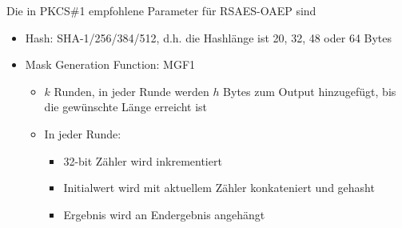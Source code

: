 \noindent Die in PKCS\#1 empfohlene Parameter für RSAES-OAEP sind 
\begin{itemize}
    \item Hash: SHA-1/256/384/512, d.h. die Hashlänge ist 20, 32, 48 oder 64 Bytes
    \item Mask Generation Function: MGF1
    \begin{itemize}
        \item $k$ Runden, in jeder Runde werden $h$ Bytes zum Output hinzugefügt, bis die gewünschte Länge erreicht ist
        \item In jeder Runde:
        \begin{itemize}
            \item 32-bit Zähler wird inkrementiert
            \item Initialwert wird mit aktuellem Zähler konkateniert und gehasht
            \item Ergebnis wird an Endergebnis angehängt
        \end{itemize}
    \end{itemize}
\end{itemize}





